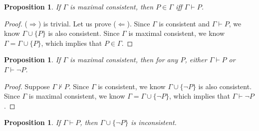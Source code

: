 \documentclass{article}
\theoremstyle{plain}
\newtheorem{prop}[thm]{Proposition}
\begin{document}
\begin{prop}
If $\Gamma$ is maximal consistent, then $P \in \Gamma$ iff $\Gamma \vdash P$.
\end{prop}
\begin{proof}
($\Rightarrow$) is trivial. Let us prove ($\Leftarrow$). Since $\Gamma$ is consistent and $\Gamma \vdash P$, we know $\Gamma \cup \{P\}$ is also consistent. Since $\Gamma$ is maximal consistent, we know $\Gamma = \Gamma \cup \{P\}$, which implies that $P \in \Gamma$.
\end{proof}

\begin{prop}
If $\Gamma$ is maximal consistent, then for any $P$, either $\Gamma \vdash P$ or $\Gamma \vdash \neg P$.
\end{prop}
\begin{proof}
Suppose $\Gamma \not \vdash P$. Since $\Gamma$ is consistent, we know $\Gamma \cup \{\neg P\}$ is also consistent. Since $\Gamma$ is maximal consistent, we know $\Gamma = \Gamma \cup \{\neg P\}$, which implies that $\Gamma \vdash \neg P$.
\end{proof}

\begin{prop}
If $\Gamma \vdash P$, then $\Gamma \cup \{\neg P\}$ is inconsistent.
\end{prop}
\end{document}
